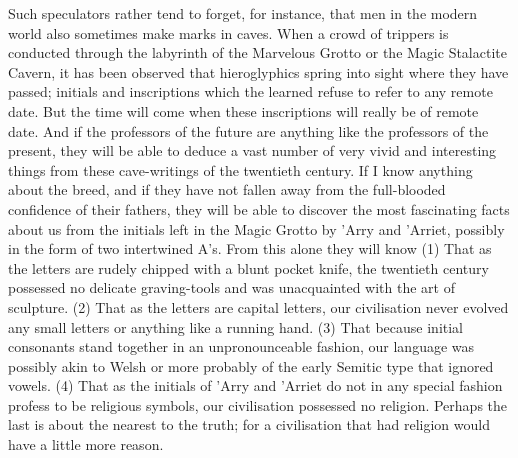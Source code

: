Such speculators rather tend to forget, for instance, that men in the modern world also sometimes make marks in caves. When a crowd of trippers is conducted through the labyrinth of the Marvelous Grotto or the Magic Stalactite Cavern, it has been observed that hieroglyphics spring into sight where they have passed; initials and inscriptions which the learned refuse to refer to any remote date. But the time will come when these inscriptions will really be of remote date. And if the professors of the future are anything like the professors of the present, they will be able to deduce a vast number of very vivid and interesting things from these cave-writings of the twentieth century. If I know anything about the breed, and if they have not fallen away from the full-blooded confidence of their fathers, they will be able to discover the most fascinating facts about us from the initials left in the Magic Grotto by 'Arry and 'Arriet, possibly in the form of two intertwined A's. From this alone they will know (1) That as the letters are rudely chipped with a blunt pocket knife, the twentieth century possessed no delicate graving-tools and was unacquainted with the art of sculpture. (2) That as the letters are capital letters, our civilisation never evolved any small letters or anything like a running hand. (3) That because initial consonants stand together in an unpronounceable fashion, our language was possibly akin to Welsh or more probably of the early Semitic type that ignored vowels. (4) That as the initials of 'Arry and 'Arriet do not in any special fashion profess to be religious symbols, our civilisation possessed no religion. Perhaps the last is about the nearest to the truth; for a civilisation that had religion would have a little more reason.

